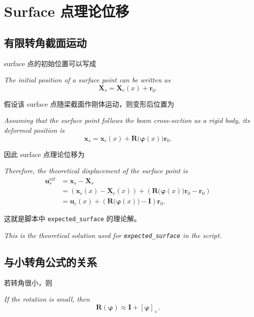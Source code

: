 \documentclass[UTF8,a4paper,11pt]{ctexart}
\begin{document}
\section{Surface 点理论位移}

\subsection{有限转角截面运动}

surface 点的初始位置可以写成
\par\noindent\emph{The initial position of a surface point can be written as}
\begin{equation}
  \bm{X}_s = \bm{X}_c(x) + \bm{r}_0.
\end{equation}

假设该 surface 点随梁截面作刚体运动，则变形后位置为
\par\noindent\emph{Assuming that the surface point follows the beam cross-section as a rigid body, its deformed position is}
\begin{equation}
  \bm{x}_s
  =
  \bm{x}_c(x)
  +
  \bm{R}\bigl(\bm{\varphi}(x)\bigr)\bm{r}_0.
\end{equation}

因此 surface 点理论位移为
\par\noindent\emph{Therefore, the theoretical displacement of the surface point is}
\begin{align}
  \bm{u}_s^{\mathrm{ref}}
  &=
  \bm{x}_s - \bm{X}_s \\
  &=
  \left(\bm{x}_c(x)-\bm{X}_c(x)\right)
  +
  \left(\bm{R}\bigl(\bm{\varphi}(x)\bigr)\bm{r}_0-\bm{r}_0\right) \\
  &=
  \bm{u}_c(x)
  +
  \left(\bm{R}\bigl(\bm{\varphi}(x)\bigr)-\bm{I}\right)\bm{r}_0.
\end{align}

这就是脚本中 \texttt{expected\_surface} 的理论解。
\par\noindent\emph{This is the theoretical solution used for \texttt{expected\_surface} in the script.}

\subsection{与小转角公式的关系}

若转角很小，则
\par\noindent\emph{If the rotation is small, then}
\begin{equation}
  \bm{R}(\bm{\varphi})
  \approx
  \bm{I} + [\bm{\varphi}]_\times.
\end{equation}
\end{document}
